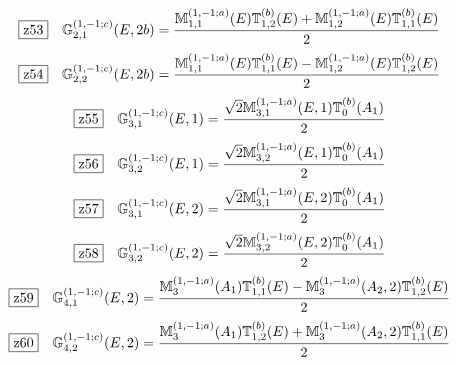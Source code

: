 \documentclass[fleqn,10pt,landscape]{jsarticle}
\begin{document}
\begin{dmath*}
\hspace*{3mm}\fbox{z53}\quad \mathbb{G}_{2,1}^{(1,-1;c)}(E,2b)=\frac{\mathbb{M}_{1,1}^{(1,-1;a)}(E) \mathbb{T}_{1,2}^{(b)}(E) + \mathbb{M}_{1,2}^{(1,-1;a)}(E) \mathbb{T}_{1,1}^{(b)}(E)}{2}
\end{dmath*}
\begin{dmath*}
\hspace*{3mm}\fbox{z54}\quad \mathbb{G}_{2,2}^{(1,-1;c)}(E,2b)=\frac{\mathbb{M}_{1,1}^{(1,-1;a)}(E) \mathbb{T}_{1,1}^{(b)}(E) - \mathbb{M}_{1,2}^{(1,-1;a)}(E) \mathbb{T}_{1,2}^{(b)}(E)}{2}
\end{dmath*}
\begin{dmath*}
\hspace*{3mm}\fbox{z55}\quad \mathbb{G}_{3,1}^{(1,-1;c)}(E,1)=\frac{\sqrt{2} \mathbb{M}_{3,1}^{(1,-1;a)}(E,1) \mathbb{T}_{0}^{(b)}(A_{1})}{2}
\end{dmath*}
\begin{dmath*}
\hspace*{3mm}\fbox{z56}\quad \mathbb{G}_{3,2}^{(1,-1;c)}(E,1)=\frac{\sqrt{2} \mathbb{M}_{3,2}^{(1,-1;a)}(E,1) \mathbb{T}_{0}^{(b)}(A_{1})}{2}
\end{dmath*}
\begin{dmath*}
\hspace*{3mm}\fbox{z57}\quad \mathbb{G}_{3,1}^{(1,-1;c)}(E,2)=\frac{\sqrt{2} \mathbb{M}_{3,1}^{(1,-1;a)}(E,2) \mathbb{T}_{0}^{(b)}(A_{1})}{2}
\end{dmath*}
\begin{dmath*}
\hspace*{3mm}\fbox{z58}\quad \mathbb{G}_{3,2}^{(1,-1;c)}(E,2)=\frac{\sqrt{2} \mathbb{M}_{3,2}^{(1,-1;a)}(E,2) \mathbb{T}_{0}^{(b)}(A_{1})}{2}
\end{dmath*}
\begin{dmath*}
\hspace*{3mm}\fbox{z59}\quad \mathbb{G}_{4,1}^{(1,-1;c)}(E,2)=\frac{\mathbb{M}_{3}^{(1,-1;a)}(A_{1}) \mathbb{T}_{1,1}^{(b)}(E) - \mathbb{M}_{3}^{(1,-1;a)}(A_{2},2) \mathbb{T}_{1,2}^{(b)}(E)}{2}
\end{dmath*}
\begin{dmath*}
\hspace*{3mm}\fbox{z60}\quad \mathbb{G}_{4,2}^{(1,-1;c)}(E,2)=\frac{\mathbb{M}_{3}^{(1,-1;a)}(A_{1}) \mathbb{T}_{1,2}^{(b)}(E) + \mathbb{M}_{3}^{(1,-1;a)}(A_{2},2) \mathbb{T}_{1,1}^{(b)}(E)}{2}
\end{dmath*}
\vspace{5mm}
\end{document}
